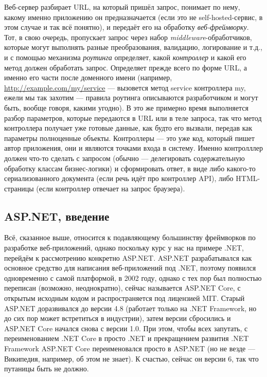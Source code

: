 \documentclass[a5paper]{article}
\begin{document}
Веб-сервер разбирает URL, на который пришёл запрос, понимает по нему, какому именно приложению он предназначается (если это не self-hosted-сервис, в этом случае и так всё понятно), и передаёт его на обработку \emph{веб-фреймворку}. Тот, в свою очередь, пропускает запрос через набор \emph{middleware}-обработчиков, которые могут выполнять разные преобразования, валидацию, логирование и т.д., и с помощью механизма \emph{роутинга} определяет, какой \emph{контроллер} и какой его метод должен обработать запрос. Определяет прежде всего по форме URL, а именно его части после доменного имени (например, \url{http://example.com/my/service} --- вызовется метод service контроллера my, ежели мы так захотим --- правила роутинга описываются разработчиком и могут быть, вообще говоря, какими угодно). В это же примерно время выполняется разбор параметров, которые передаются в URL или в теле запроса, так что метод контроллера получает уже готовые данные, как будто его вызвали, передав как параметры полноценные объекты. Контроллеры --- это уже код, который пишет автор приложения, они и являются точками входа в систему. Именно контролллер должен что-то сделать с запросом (обычно --- делегировать содержательную обработку классам бизнес-логики) и сформировать ответ, в виде либо какого-то сериализованного документа (если речь идёт про контроллер API), либо HTML-страницы (если контроллер отвечает на запрос браузера).

\subsection{ASP.NET, введение}

Всё, сказанное выше, относится к подавляющему большинству фреймворков по разработке веб-приложений, однако поскольку курс у нас на примере .NET, перейдём  к рассмотрению конкретно ASP.NET. ASP.NET разрабатывался как основное средство для написания веб-приложений под .NET, поэтому появился одновременно с самой платформой, в 2002 году, однако с тех пор был полностью переписан (возможно, неоднократно), сейчас называется ASP.NET Core, с открытым исходным кодом и распространяется под лицензией MIT. Старый ASP.NET доразвивался до версии 4.8 (работает только на .NET Framework, но до сих пор может встретиться в индустрии), затем версии сбросились и ASP.NET Core начался снова с версии 1.0. При этом, чтобы всех запутать, с переименованием .NET Core в просто .NET и прекращением развития .NET Framework ASP.NET Core переименовался просто в ASP.NET (но не везде --- Википедия, например, об этом не знает). К счастью, сейчас он версии 6, так что путаницы быть не должно.
\end{document}
